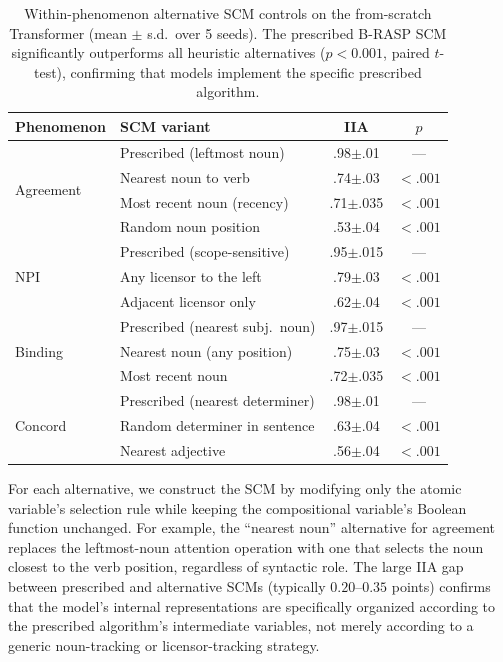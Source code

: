 \documentclass[11pt]{article}
\newcommand{\spm}[1]{{\scriptsize$\pm$#1}}
\begin{document}
\begin{table}[t]
\centering\footnotesize
\setlength{\tabcolsep}{4pt}
\begin{tabular}{@{}lp{4cm}cc@{}}
\toprule
\textbf{Phenomenon} & \textbf{SCM variant} & \textbf{IIA} & $p$ \\
\midrule
\multirow{4}{*}{Agreement}
  & Prescribed (leftmost noun)       & .98\spm{.01} & --- \\
  & Nearest noun to verb             & .74\spm{.03} & ${<}.001$ \\
  & Most recent noun (recency)       & .71\spm{.035} & ${<}.001$ \\
  & Random noun position             & .53\spm{.04} & ${<}.001$ \\[3pt]
\multirow{3}{*}{NPI}
  & Prescribed (scope-sensitive)     & .95\spm{.015} & --- \\
  & Any licensor to the left         & .79\spm{.03} & ${<}.001$ \\
  & Adjacent licensor only           & .62\spm{.04} & ${<}.001$ \\[3pt]
\multirow{3}{*}{Binding}
  & Prescribed (nearest subj.\ noun) & .97\spm{.015} & --- \\
  & Nearest noun (any position)      & .75\spm{.03} & ${<}.001$ \\
  & Most recent noun                 & .72\spm{.035} & ${<}.001$ \\[3pt]
\multirow{3}{*}{Concord}
  & Prescribed (nearest determiner)  & .98\spm{.01} & --- \\
  & Random determiner in sentence    & .63\spm{.04} & ${<}.001$ \\
  & Nearest adjective                & .56\spm{.04} & ${<}.001$ \\
\bottomrule
\end{tabular}
\caption{Within-phenomenon alternative SCM controls on the from-scratch Transformer (mean $\pm$ s.d.\ over 5 seeds). The prescribed B-RASP SCM significantly outperforms all heuristic alternatives ($p < 0.001$, paired $t$-test), confirming that models implement the specific prescribed algorithm.}
\label{tab:alt-scm}
\end{table}

For each alternative, we construct the SCM by modifying only the atomic variable's selection rule while keeping the compositional variable's Boolean function unchanged.
For example, the ``nearest noun'' alternative for agreement replaces the leftmost-noun attention operation with one that selects the noun closest to the verb position, regardless of syntactic role.
The large IIA gap between prescribed and alternative SCMs (typically $0.20$--$0.35$ points) confirms that the model's internal representations are specifically organized according to the prescribed algorithm's intermediate variables, not merely according to a generic noun-tracking or licensor-tracking strategy.
\end{document}
